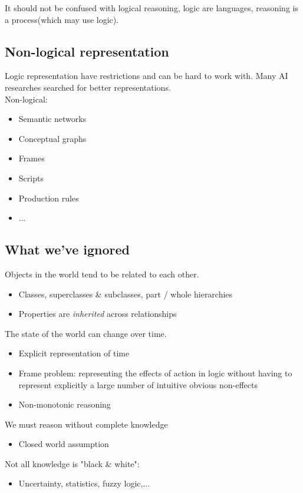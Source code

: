 It should not be confused with logical reasoning, logic are languages, reasoning is a process(which may use logic).

\subsection{Non-logical representation}
Logic representation have restrictions and can be hard to work with.
Many AI researches searched for better representations.\\

Non-logical:
\begin{itemize}
\item Semantic networks
\item Conceptual graphs
\item Frames
\item Scripts
\item Production rules
\item ...
\end{itemize} 

\subsection{What we've ignored}
Objects in the world tend to be related to each other.
\begin{itemize}
\item Classes, superclasses \& subclasses, part / whole hierarchies
\item Properties are \textit{inherited} across relationships
\end{itemize}

The state of the world can change over time.
\begin{itemize}
\item Explicit representation of time
\item Frame problem: representing the effects of action in logic without having to represent explicitly a large number of intuitive obvious non-effects
\item Non-monotonic reasoning
\end{itemize}

We must reason without complete knowledge
\begin{itemize}
\item Closed world assumption
\end{itemize}

Not all knowledge is "black \& white":
\begin{itemize}
\item Uncertainty, statistics, fuzzy logic,...
\end{itemize}

